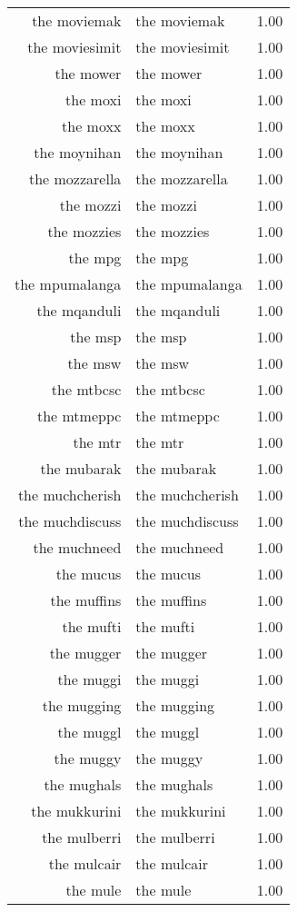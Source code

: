 \begin{table}[ht]
\begin{tabular}{rlr}
  the moviemak & the moviemak & 1.00 \\ 
  the moviesimit & the moviesimit & 1.00 \\ 
  the mower & the mower & 1.00 \\ 
  the moxi & the moxi & 1.00 \\ 
  the moxx & the moxx & 1.00 \\ 
  the moynihan & the moynihan & 1.00 \\ 
  the mozzarella & the mozzarella & 1.00 \\ 
  the mozzi & the mozzi & 1.00 \\ 
  the mozzies & the mozzies & 1.00 \\ 
  the mpg & the mpg & 1.00 \\ 
  the mpumalanga & the mpumalanga & 1.00 \\ 
  the mqanduli & the mqanduli & 1.00 \\ 
  the msp & the msp & 1.00 \\ 
  the msw & the msw & 1.00 \\ 
  the mtbcsc & the mtbcsc & 1.00 \\ 
  the mtmeppc & the mtmeppc & 1.00 \\ 
  the mtr & the mtr & 1.00 \\ 
  the mubarak & the mubarak & 1.00 \\ 
  the muchcherish & the muchcherish & 1.00 \\ 
  the muchdiscuss & the muchdiscuss & 1.00 \\ 
  the muchneed & the muchneed & 1.00 \\ 
  the mucus & the mucus & 1.00 \\ 
  the muffins & the muffins & 1.00 \\ 
  the mufti & the mufti & 1.00 \\ 
  the mugger & the mugger & 1.00 \\ 
  the muggi & the muggi & 1.00 \\ 
  the mugging & the mugging & 1.00 \\ 
  the muggl & the muggl & 1.00 \\ 
  the muggy & the muggy & 1.00 \\ 
  the mughals & the mughals & 1.00 \\ 
  the mukkurini & the mukkurini & 1.00 \\ 
  the mulberri & the mulberri & 1.00 \\ 
  the mulcair & the mulcair & 1.00 \\ 
  the mule & the mule & 1.00 \\ 

\end{tabular}
\end{table}
